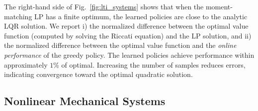 \documentclass[journal,twoside,web]{ieeecolor}
\newcommand{\review}{\color{black}}
\begin{document}
The right-hand side of Fig.~\ref{fig:lti_systems} shows that {\review when the moment-matching LP has a finite optimum, the learned policies are close to the analytic LQR
solution.} 
We report i) the normalized difference between the optimal value function {\review (computed by solving the Riccati equation)} and the LP solution, and ii) the normalized difference between the optimal value function and the \textit{online performance} of the greedy policy. 
The learned policies achieve performance within approximately $1\%$ of optimal. Increasing the number of samples reduces errors, indicating convergence toward the optimal quadratic solution.


\subsection{Nonlinear Mechanical Systems}
\end{document}
